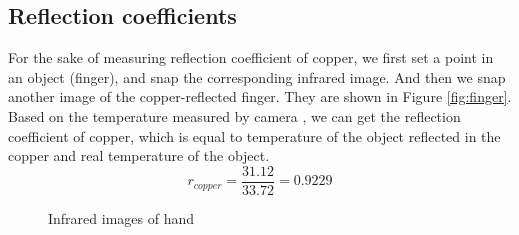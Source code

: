 \documentclass[english]{article}
\begin{document}
\subsection{Reflection coefficients}
For the sake of measuring reflection coefficient of copper, we first set a point in an object (finger), and snap the corresponding infrared image.
And then we snap another image of the copper-reflected finger.
They are shown in Figure \ref{fig:finger}. 
Based on the temperature measured by camera , we can get the reflection coefficient of copper, which is equal to temperature of the object reflected in the copper and real temperature of the object.
$$
r_{copper} = \frac{31.12}{33.72} = 0.9229
$$
\begin{figure}[H]
	\centering
	\caption{Infrared images of hand}
	\label{fig:Transf}
\end{figure}
\end{document}
